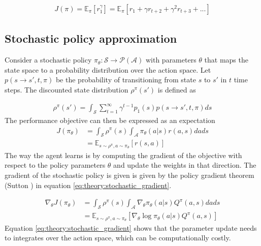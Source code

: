 \documentclass[class=book, crop=false]{standalone}
\begin{document}
\begin{equation}
   \begin{aligned}\label{eq:theory:max_discounted_return}
J(\pi)
= \mathbb{E}_{\pi}[r^{\gamma}_{1}]
= \mathbb{E}_{\pi}[ r_{1} + \gamma r_{t+2} + \gamma^{2} r_{t+3} + ...]
\end{aligned} 
\end{equation}

\subsection{Stochastic policy approximation}\label{section:stochastic_policy_approx}
Consider a stochastic policy $\pi_{\theta}: \mathcal{S}\to \mathcal{P}(\mathcal{A})$ with parameters $\theta$ that maps the state space to a probability distribution over the action space. Let $p(s\to s',t,\pi)$ be the probability of transitioning from state $s$ to $s'$ in $t$ time steps. The discounted state distribution $\rho^{\pi}(s')$ is defined as   

\begin{equation}
   \begin{aligned}\label{eq:theory:discounted_state_distribution}
    \rho^{\pi}(s') = \int_{\mathcal{S}}\sum_{t=1}^{\infty }\gamma^{t-1}p_{1}(s)
    p(s \to s',t,\pi)ds
\end{aligned} 
\end{equation}
The performance objective can then be expressed as an expectation
\begin{equation}
   \begin{aligned}\label{eq:theory:objective_expected_stochastic}
    J(\pi_{\theta}) &= 
    \int_{\mathcal{S}}\rho^{\pi}(s) \int_{\mathcal{A}}\pi_{\theta}(a|s)r(a,s)da ds 
    \\
    &=
    \mathbb{E}_{s\sim \rho^{\pi},a \sim \pi_{\theta}}[r(s,a)]
\end{aligned} 
\end{equation}
 The way the agent learns is by computing the gradient of the objective with respect to the policy parameters $\theta$ and update the weights in that direction. The gradient of the stochastic policy is given is given by the policy gradient theorem (Sutton \cite{Sutton1998}) in equation \eqref{eq:theory:stochastic_gradient}.

\begin{equation}
   \begin{aligned}\label{eq:theory:stochastic_gradient}
    \nabla_{\theta} J(\pi_{\theta}) &= 
     \int_{\mathcal{S}}\rho^{\pi}(s)
     \int_{\mathcal{A}} \nabla_{\theta} \pi_{\theta}(a|s)Q^{\pi}(a,s)da ds
     \\
     &= \mathbb{E}_{s\sim \rho^{\pi},a \sim \pi_{\theta}}
     [\nabla_{\theta} \log \pi_{\theta}(a|s)Q^{\pi}(a,s) ]
\end{aligned} 
\end{equation}
Equation \eqref{eq:theory:stochastic_gradient} shows that the parameter update needs to integrates over the action space, which can be computationally costly.
\end{document}
